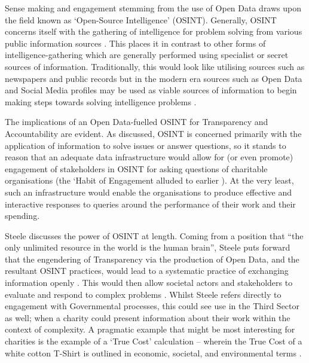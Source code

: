 Sense making and engagement stemming from the use of Open Data draws upon the field known as `Open-Source Intelligence' (OSINT). Generally, OSINT concerns itself with the gathering of intelligence for problem solving from various public information sources \cite{bradbury_plain_2011, glassman_intelligence_2012}. This places it in contrast to other forms of intelligence-gathering which are generally performed using specialist or secret sources of information. Traditionally, this would look like utilising sources such as newspapers and public records but in the modern era sources such as Open Data and Social Media profiles may be used as viable sources of information to begin making steps towards solving intelligence problems \cite{bizer_emerging_2009}.

The implications of an Open Data-fuelled OSINT for Transparency and Accountability are evident. As discussed, OSINT is concerned primarily with the application of information to solve issues or answer questions, so it stands to reason that an adequate data infrastructure would allow for (or even promote) engagement of stakeholders in OSINT for asking questions of charitable organisations (the `Habit of Engagement alluded to earlier \cite{gordon_making_2013-1}). At the very least, such an infrastructure would enable the organisations to produce effective and interactive responses to queries around the performance of their work and their spending. 

Steele discusses the power of OSINT at length. Coming from a position that ``the only unlimited resource in the world is the human brain'', Steele puts forward that the engendering of Transparency via the production of Open Data, and the resultant OSINT practices, would lead to a systematic practice of exchanging information openly \cite{steele_open-source_2012}. This would then allow societal actors and stakeholders to evaluate and respond to complex problems \cite{steele_open-source_2012}. Whilst Steele refers directly to engagement with Governmental processes, this could see use in the Third Sector as well; when a charity could present information about their work within the context of complexity. A pragmatic example that might be most interesting for charities is the example of a `True Cost' calculation --  wherein the True Cost of a white cotton T-Shirt is outlined in economic, societal, and environmental terms \cite{steele_open-source_2012}.

